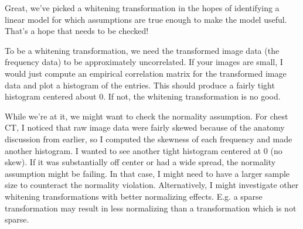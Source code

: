 \documentclass[12pt]{article}
\begin{document}
Great, we've picked a whitening transformation in the hopes of identifying a linear model for which assumptions are true enough to make the model useful. That's a hope that needs to be checked!

To be a whitening transformation, we need the transformed image data (the frequency data) to be approximately uncorrelated. If your images are small, I would just compute an empirical correlation matrix for the transformed image data and plot a histogram of the entries. This should produce a fairly tight histogram centered about 0. If not, the whitening transformation is no good.

While we're at it, we might want to check the normality assumption. For chest CT, I noticed that raw image data were fairly skewed because of the anatomy discussion from earlier, so I computed the skewness of each frequency and made another histogram. I wanted to see another tight histogram centered at 0 (no skew). If it was substantially off center or had a wide spread, the normality assumption might be failing. In that case, I might need to have a larger sample size to counteract the normality violation. Alternatively, I might investigate other whitening transformations with better normalizing effects. E.g. a sparse transformation may result in less normalizing than a transformation which is not sparse.
\end{document}
